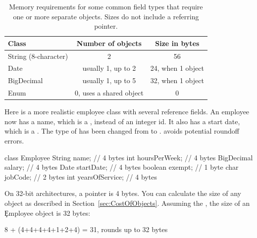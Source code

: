 \begin{table}[htbp]
  \centering
\begin{tabular}{lcc} \toprule
	Class & Number of objects & Size in bytes \\ \midrule
	String (8-character) & 2 & 56 \\
	Date & usually 1, up to 2 & 24, when 1 object \\
	BigDecimal & usually 1, up to 5 & 32, when 1 object \\
	Enum & 0, uses a shared object & 0 \\
	\bottomrule
\end{tabular}
  \caption{Memory requirements for some common field types that require one
  or more separate objects. Sizes do not include a referring pointer.
  }
  \label{tab:common-delegated-field-types}
\end{table}

Here is a more realistic employee class with several reference fields. An
employee now has a name, which is a , instead of an integer id. It
also has a start date, which is a . The type of  has
been changed from  to .  avoids potential roundoff errors.
\begin{shortlisting} 
class Employee {
    String name;                // 4 bytes
    int hoursPerWeek;           // 4 bytes
    BigDecimal salary;          // 4 bytes
    Date startDate;             // 4 bytes
    boolean exempt;             // 1 byte
    char jobCode;               // 2 bytes
    int yearsOfService;         // 4 bytes
}
\end{shortlisting}

On 32-bit architectures, a pointer is 4 bytes. 
You can calculate the size of any object as described in
Section~\ref{sec:CostOfObjects}.
Assuming the \oracle \jre, the size of an \c{Employee} object is 32 bytes:
\begin{shortlisting}
8 + (4+4+4+4+1+2+4) = 31, rounds up to 32 bytes
\end{shortlisting}

